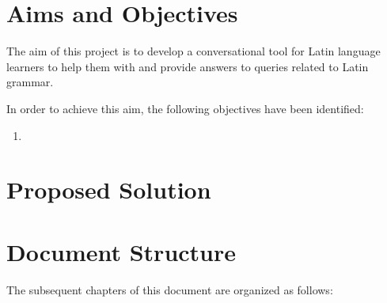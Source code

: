 \section{Aims and Objectives}
\label{sec:aims_and_objectives}

The aim of this project is to develop a conversational tool 
for Latin language learners to help them with and provide 
answers to queries related to Latin grammar.

In order to achieve this aim, the following objectives have 
been identified:


\begin{enumerate}
    \item 
\end{enumerate}




\section{Proposed Solution}
\label{sec:proposed_solution}

\section{Document Structure}
\label{sec:document_structure}

The subsequent chapters of this document are organized as follows:

